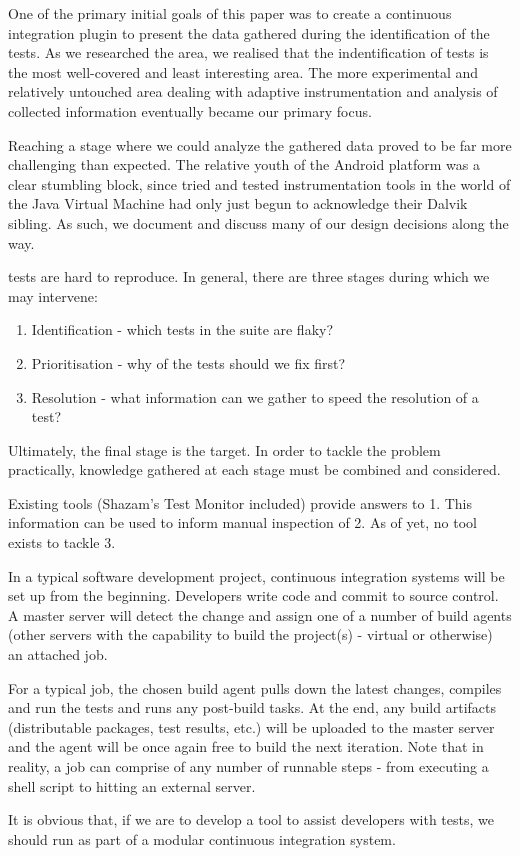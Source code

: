 One of the primary initial goals of this paper was to create a continuous integration plugin to present the data gathered during the identification of the \flaky tests. As we researched the area, we realised that the indentification of \flaky tests is the most well-covered and least interesting area. The more experimental and relatively untouched area dealing with adaptive instrumentation and analysis of collected information eventually became our primary focus.

Reaching a stage where we could analyze the gathered data proved to be far more challenging than expected. The relative youth of the Android platform was a clear stumbling block, since tried and tested instrumentation tools in the world of the Java Virtual Machine had only just begun to acknowledge their Dalvik sibling. As such, we document and discuss many of our design decisions along the way.

\flaky tests are hard to reproduce. In general, there are three stages during which we may intervene:
\begin{enumerate}
	\item Identification - which tests in the suite are flaky?
	\item Prioritisation - why of the \flaky tests should we fix first?
	\item Resolution - what information can we gather to speed the resolution of a test?
\end{enumerate}

Ultimately, the final stage is the target. In order to tackle the problem practically, knowledge gathered at each stage must be combined and considered.

Existing tools (Shazam’s \flaky Test Monitor included) provide answers to 1. This information can be used to inform manual inspection of 2. As of yet, no tool exists to tackle 3.

In a typical software development project, continuous integration systems will be set up from the beginning. Developers write code and commit to source control. A master server will detect the change and assign one of a number of build agents (other servers with the capability to build the project(s) - virtual or otherwise) an attached job.

For a typical job, the chosen build agent pulls down the latest changes, compiles and run the tests and runs any post-build tasks. At the end, any build artifacts (distributable packages, test results, etc.) will be uploaded to the master server and the agent will be once again free to build the next iteration. Note that in reality, a job can comprise of any number of runnable steps - from executing a shell script to hitting an external server.


It is obvious that, if we are to develop a tool to assist developers with \flaky tests, we should run as part of a modular continuous integration system.

